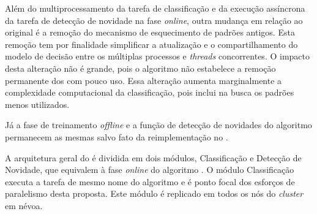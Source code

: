 Além do multiprocessamento da tarefa de classificação e da execução assíncrona da
tarefa de detecção de novidade na fase \emph{online}, outra mudança em relação
ao \minas original é a remoção do mecanismo de esquecimento de padrões antigos.
Esta remoção tem por finalidade simplificar a atualização e o compartilhamento
do modelo de decisão entre os múltiplas processos e \emph{threads} concorrentes.
% 
O impacto desta alteração não é grande, pois o algoritmo \minas não estabelece a
remoção permanente dos \mclusters com pouco uso.
Essa alteração aumenta marginalmente a complexidade computacional da
classificação, pois inclui na busca os padrões menos utilizados.

Já a fase de treinamento \emph{offline} e a função de detecção de novidades do
algoritmo \minas permanecem as mesmas salvo fato da reimplementação no \mfog.



A arquitetura geral do \mfog é dividida em dois módulos, Classificação e
Detecção de Novidade, que equivalem à fase \emph{online} do algoritmo \minas.
O módulo Classificação executa a tarefa de mesmo nome do algoritmo \minas e é
ponto focal dos esforços de paralelismo desta proposta.
Este módulo é replicado em todos os nós do \emph{cluster} %
em névoa.

